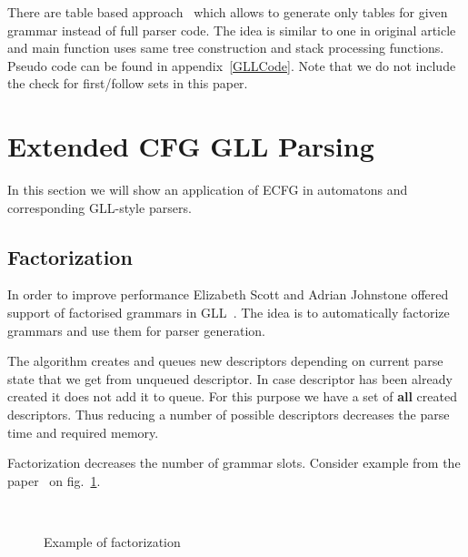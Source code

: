 \documentclass[runningheads,a4paper]{llncs}
\begin{document}
There are table based approach~\cite{ragozina} which allows to generate only tables for given grammar instead of full parser code.
The idea is similar to one in original article and main function uses same tree construction and stack processing functions.
Pseudo code can be found in appendix~\ref{GLLCode}. Note that we do not include the check for first/follow sets in this paper.




\section{Extended CFG GLL Parsing}%

In this section we will show an application of ECFG in automatons and corresponding GLL-style parsers.

\subsection{Factorization}%

In order to improve performance Elizabeth Scott and Adrian Johnstone offered support of factorised grammars in GLL~\cite{scott2016structuring}. 
The idea is to automatically factorize grammars and use them for parser generation. 

The algorithm creates and queues new descriptors depending on current parse state that we get from unqueued descriptor. 
In case descriptor has been already created it does not add it to queue. For this purpose we have a set of
\textbf{all} created descriptors. Thus reducing a number of possible descriptors decreases the parse time
and required memory.

Factorization decreases the number of grammar slots. 
Consider example from the paper~\cite{scott2016structuring} on fig.~\ref{fig:ExampleOfFactorization}.

\begin{figure}
    \centering
    ~
    \caption{Example of factorization}
    \label{fig:ExampleOfFactorization}
\end{figure}
\end{document}
